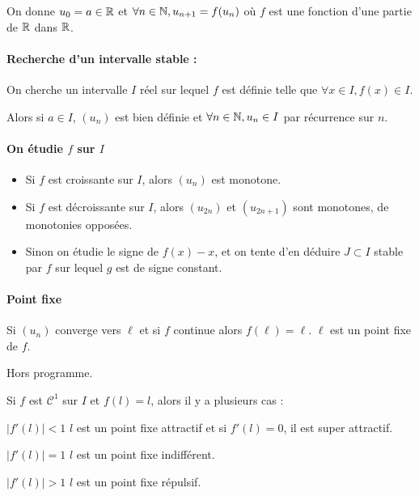 On donne $u_0 = a \in \mathbb{R}$ et $\forall n \in \mathbb{N}, u_{n + 1} = f(u_n)$ où $f$ est une fonction 
d'une partie de $\mathbb{R}$ dans $\mathbb{R}$.

\paragraph{Recherche d'un intervalle stable :}

On cherche un intervalle $I$ réel sur lequel $f$ est définie
telle que $\forall x \in I, f(x) \in I$.

Alors si $a \in I$, $(u_n)$ est bien définie et $\forall n \in \mathbb{N}, u_n \in I$ par récurrence 
sur $n$. 

\paragraph{On étudie $f$ sur $I$}

\begin{itemize}
    \item Si $f$ est croissante sur $I$, alors $(u_n)$ est monotone.
    \item Si $f$ est décroissante sur $I$, alors $(u_{2n})$ et $(u_{2n + 1})$ sont monotones, de 
        monotonies opposées.
    \item Sinon on étudie le signe de $f(x) - x$, et on tente d'en déduire $J \subset I$ stable
        par $f$ sur lequel $g$ est de signe constant. 
\end{itemize}

\paragraph{Point fixe}

Si $(u_n)$ converge vers $\ell$ et si $f$ continue alors $f(\ell) = \ell$. $\ell$ est un point fixe de $f$. 

\begin{remarque}
    Hors programme. 

    Si $f$ est $\mathscr C^1$ sur $I$ et $f(l) = l$, alors il y a plusieurs cas : 

    \qquad \uline{$|f'(l)| < 1$}
    \avspace $l$ est un point fixe attractif et si $f'(l) = 0$, il est super attractif. 

    \avspace \qquad \uline{$|f'(l)| = 1$}
    \avspace $l$ est un point fixe indifférent. 

    \avspace \qquad \uline{$|f'(l)| > 1$}
    \avspace $l$ est un point fixe répulsif.
\end{remarque}

